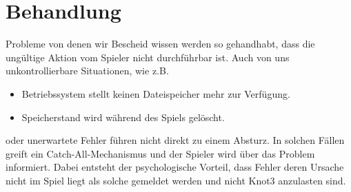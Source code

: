 %



\section{Behandlung}
\label{Abschnitt:Ausnahmen:Behandlungen}

Probleme von denen wir Bescheid wissen werden so gehandhabt, dass die ungültige Aktion vom Spieler nicht durchführbar ist. Auch von uns unkontrollierbare Situationen, wie z.B.

\begin{itemize}

	\item Betriebssystem stellt keinen Dateispeicher mehr zur Verfügung.
	
	\item Speicherstand wird während des Spiels gelöscht.

\end{itemize}

oder unerwartete Fehler führen nicht direkt zu einem Absturz. In solchen Fällen greift ein \glqq Catch-All\grqq-Mechanismus und der Spieler wird über das Problem informiert. Dabei entsteht der psychologische Vorteil, dass Fehler deren Ursache nicht im Spiel liegt als solche gemeldet werden und nicht Knot3 anzulasten sind.\\


